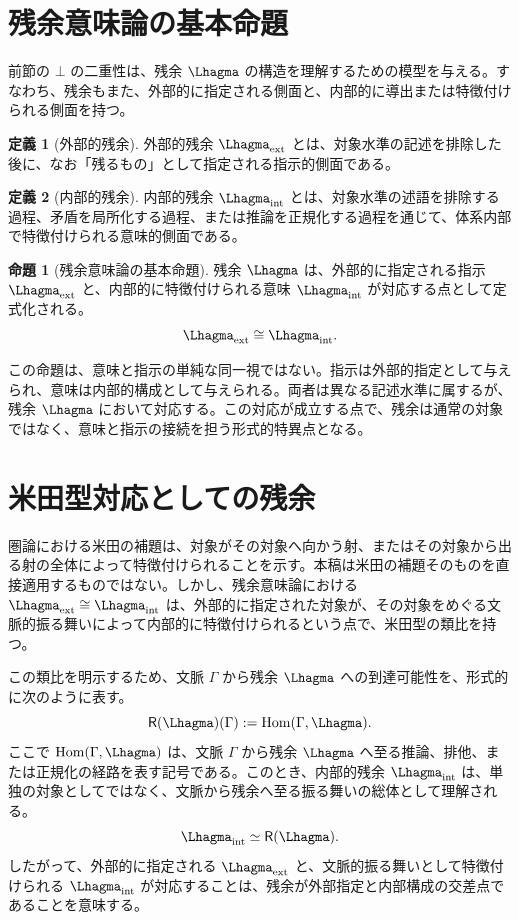 \documentclass[11pt,a4paper]{article}
\newcommand{\ctx}{\Gamma}
\newcommand{\lext}{\Lhagma_{\mathrm{ext}}}
\newcommand{\lint}{\Lhagma_{\mathrm{int}}}
\newcommand{\yon}{\mathsf{R}}
\theoremstyle{definition}
\newtheorem{definition}{定義}[section]
\newtheorem{thesis}{命題}[section]
\begin{document}
\section{残余意味論の基本命題}

前節の $\bot$ の二重性は、残余 $\Lhagma$ の構造を理解するための模型を与える。すなわち、残余もまた、外部的に指定される側面と、内部的に導出または特徴付けられる側面を持つ。

\begin{definition}[外部的残余]
外部的残余 $\lext$ とは、対象水準の記述を排除した後に、なお「残るもの」として指定される指示的側面である。
\end{definition}

\begin{definition}[内部的残余]
内部的残余 $\lint$ とは、対象水準の述語を排除する過程、矛盾を局所化する過程、または推論を正規化する過程を通じて、体系内部で特徴付けられる意味的側面である。
\end{definition}

\begin{thesis}[残余意味論の基本命題]
残余 $\Lhagma$ は、外部的に指定される指示 $\lext$ と、内部的に特徴付けられる意味 $\lint$ が対応する点として定式化される。
\[
\lext \cong \lint .
\]
\end{thesis}

この命題は、意味と指示の単純な同一視ではない。指示は外部的指定として与えられ、意味は内部的構成として与えられる。両者は異なる記述水準に属するが、残余 $\Lhagma$ において対応する。この対応が成立する点で、残余は通常の対象ではなく、意味と指示の接続を担う形式的特異点となる。

\section{米田型対応としての残余}

圏論における米田の補題は、対象がその対象へ向かう射、またはその対象から出る射の全体によって特徴付けられることを示す。本稿は米田の補題そのものを直接適用するものではない。しかし、残余意味論における $\lext \cong \lint$ は、外部的に指定された対象が、その対象をめぐる文脈的振る舞いによって内部的に特徴付けられるという点で、米田型の類比を持つ。

この類比を明示するため、文脈 $\ctx$ から残余 $\Lhagma$ への到達可能性を、形式的に次のように表す。
\[
\yon(\Lhagma)(\ctx) := \mathrm{Hom}(\ctx, \Lhagma).
\]
ここで $\mathrm{Hom}(\ctx, \Lhagma)$ は、文脈 $\ctx$ から残余 $\Lhagma$ へ至る推論、排他、または正規化の経路を表す記号である。このとき、内部的残余 $\lint$ は、単独の対象としてではなく、文脈から残余へ至る振る舞いの総体として理解される。
\[
\lint \simeq \yon(\Lhagma).
\]
したがって、外部的に指定される $\lext$ と、文脈的振る舞いとして特徴付けられる $\lint$ が対応することは、残余が外部指定と内部構成の交差点であることを意味する。
\end{document}

